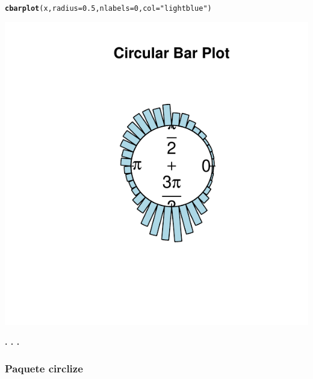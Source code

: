 \documentclass{article}\usepackage[]{graphicx}\usepackage[]{color}
\makeatletter
\def\maxwidth{ %
  \ifdim\Gin@nat@width>\linewidth
    \linewidth
  \else
    \Gin@nat@width
  \fi
}
\newcommand{\hlnum}[1]{\textcolor[rgb]{0.686,0.059,0.569}{#1}}%
\newcommand{\hlstr}[1]{\textcolor[rgb]{0.192,0.494,0.8}{#1}}%
\newcommand{\hlstd}[1]{\textcolor[rgb]{0.345,0.345,0.345}{#1}}%
\newcommand{\hlkwc}[1]{\textcolor[rgb]{0.333,0.667,0.333}{#1}}%
\newcommand{\hlkwd}[1]{\textcolor[rgb]{0.737,0.353,0.396}{\textbf{#1}}}%
\newenvironment{kframe}{%
 \def\at@end@of@kframe{}%
 \ifinner\ifhmode%
  \def\at@end@of@kframe{\end{minipage}}%
  \begin{minipage}{\columnwidth}%
 \fi\fi%
 \def\FrameCommand##1{\hskip\@totalleftmargin \hskip-\fboxsep
 \colorbox{shadecolor}{##1}\hskip-\fboxsep
     \hskip-\linewidth \hskip-\@totalleftmargin \hskip\columnwidth}%
 \MakeFramed {\advance\hsize-\width
   \@totalleftmargin\z@ \linewidth\hsize
   \@setminipage}}%
 {\par\unskip\endMakeFramed%
 \at@end@of@kframe}
\newenvironment{knitrout}{}{} %
\makeatother
\begin{document}
\begin{knitrout}
\color{fgcolor}\begin{kframe}
\begin{alltt}
\hlkwd{cbarplot}\hlstd{(x,} \hlkwc{radius}\hlstd{=}\hlnum{0.5}\hlstd{,} \hlkwc{nlabels}\hlstd{=}\hlnum{0}\hlstd{,} \hlkwc{col}\hlstd{=}\hlstr{"lightblue"}\hlstd{)}
\end{alltt}
\end{kframe}

{\centering \includegraphics[width=\maxwidth]{figure/plot_cplots_cr1-1} 

}



\end{knitrout}
\begin{center}
\textbf{. . .}
\end{center}
\subsubsection{Paquete circlize}
\end{document}
